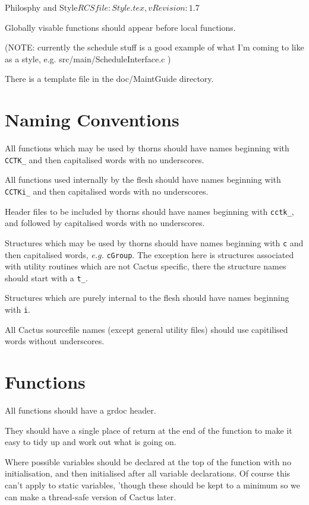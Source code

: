 \begin{cactuspart}{1}{Philosphy and Style}{$RCSfile: Style.tex,v $}{$Revision: 1.7 $}
\begin{itemize}
\end{itemize}

Globally visable functions should appear before local
functions.

(NOTE: currently the schedule stuff is a good example of
what I'm coming to like as a style, e.g.
src/main/ScheduleInterface.c )

There is a template file in the doc/MaintGuide directory.

\section{Naming Conventions}

All functions which may be used by thorns should have names beginning
with {\tt CCTK\_} and then capitalised words with no underscores.

All functions used internally by the flesh should have names beginning with
{\tt CCTKi\_} and then capitalised words with no underscores.

Header files to be included by thorns should have names beginning with
{\tt cctk\_}, and followed by capitalised words with no underscores.

Structures which may be used by thorns should have names beginning with
{\tt c} and then capitalised words, {\it e.g.} {\tt cGroup}. The 
exception here is structures associated with utility routines which
are not Cactus specific, there the structure names should start with a
{\tt t\_}. 

Structures which are purely internal to the flesh should have
names beginning with {\tt i}.

All Cactus sourcefile names (except general utility files) should 
use capitilised words without underscores.

\section{Functions}

All functions should have a grdoc header.

They should have a single place of return at the end of the function to
make it easy to tidy up and work out what is going on.

Where possible variables should be declared at the top of the function with
no initialisation, and then initialised after all variable declarations. Of
course this can't apply to static variables, 'though these should be kept to
a minimum so we can make a thread-safe version of Cactus later.

\end{cactuspart}
